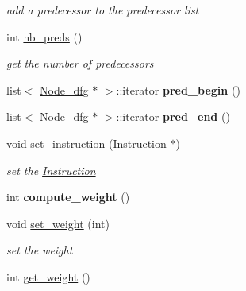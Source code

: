 \begin{DoxyCompactItemize}
\begin{DoxyCompactList}\small\item\em add a predecessor to the predecessor list \end{DoxyCompactList}\item 
\hypertarget{class_node__dfg_adef5e6e3362133f6adb38d404c8d8cf6}{}int \hyperlink{class_node__dfg_adef5e6e3362133f6adb38d404c8d8cf6}{nb\+\_\+preds} ()\label{class_node__dfg_adef5e6e3362133f6adb38d404c8d8cf6}

\begin{DoxyCompactList}\small\item\em get the number of predecessors \end{DoxyCompactList}\item 
\hypertarget{class_node__dfg_a769af0d7836679d6ee9abcc55d399887}{}list$<$ \hyperlink{class_node__dfg}{Node\+\_\+dfg} $\ast$ $>$\+::iterator {\bfseries pred\+\_\+begin} ()\label{class_node__dfg_a769af0d7836679d6ee9abcc55d399887}

\item 
\hypertarget{class_node__dfg_a86fc141e0697ae944900625212579957}{}list$<$ \hyperlink{class_node__dfg}{Node\+\_\+dfg} $\ast$ $>$\+::iterator {\bfseries pred\+\_\+end} ()\label{class_node__dfg_a86fc141e0697ae944900625212579957}

\item 
\hypertarget{class_node__dfg_a83747917d9c87b11633779731bcda162}{}void \hyperlink{class_node__dfg_a83747917d9c87b11633779731bcda162}{set\+\_\+instruction} (\hyperlink{class_instruction}{Instruction} $\ast$)\label{class_node__dfg_a83747917d9c87b11633779731bcda162}

\begin{DoxyCompactList}\small\item\em set the \hyperlink{class_instruction}{Instruction} \end{DoxyCompactList}\item 
\hypertarget{class_node__dfg_a395b778a0b23ae2bcfd6081d84661239}{}int {\bfseries compute\+\_\+weight} ()\label{class_node__dfg_a395b778a0b23ae2bcfd6081d84661239}

\item 
\hypertarget{class_node__dfg_af23f48b1521a90178cc5c9a59da3ab3c}{}void \hyperlink{class_node__dfg_af23f48b1521a90178cc5c9a59da3ab3c}{set\+\_\+weight} (int)\label{class_node__dfg_af23f48b1521a90178cc5c9a59da3ab3c}

\begin{DoxyCompactList}\small\item\em set the weight \end{DoxyCompactList}\item 
\hypertarget{class_node__dfg_a561e80f51cb9a71b22f22e8d2e6685de}{}int \hyperlink{class_node__dfg_a561e80f51cb9a71b22f22e8d2e6685de}{get\+\_\+weight} ()\label{class_node__dfg_a561e80f51cb9a71b22f22e8d2e6685de}


\end{DoxyCompactItemize}
